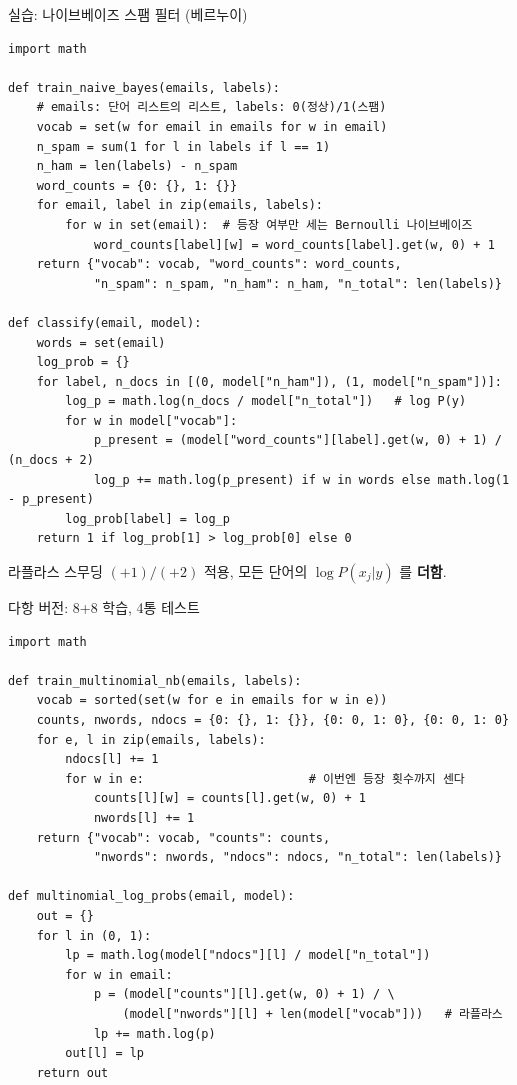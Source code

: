 \documentclass[aspectratio=169,11pt]{beamer}
\begin{document}
\begin{frame}[fragile]{실습: 나이브베이즈 스팸 필터 (베르누이)}
  \begin{lstlisting}
import math

def train_naive_bayes(emails, labels):
    # emails: 단어 리스트의 리스트, labels: 0(정상)/1(스팸)
    vocab = set(w for email in emails for w in email)
    n_spam = sum(1 for l in labels if l == 1)
    n_ham = len(labels) - n_spam
    word_counts = {0: {}, 1: {}}
    for email, label in zip(emails, labels):
        for w in set(email):  # 등장 여부만 세는 Bernoulli 나이브베이즈
            word_counts[label][w] = word_counts[label].get(w, 0) + 1
    return {"vocab": vocab, "word_counts": word_counts,
            "n_spam": n_spam, "n_ham": n_ham, "n_total": len(labels)}

def classify(email, model):
    words = set(email)
    log_prob = {}
    for label, n_docs in [(0, model["n_ham"]), (1, model["n_spam"])]:
        log_p = math.log(n_docs / model["n_total"])   # log P(y)
        for w in model["vocab"]:
            p_present = (model["word_counts"][label].get(w, 0) + 1) / (n_docs + 2)
            log_p += math.log(p_present) if w in words else math.log(1 - p_present)
        log_prob[label] = log_p
    return 1 if log_prob[1] > log_prob[0] else 0
  \end{lstlisting}
  {\footnotesize 라플라스 스무딩 $(+1)/(+2)$ 적용, 모든 단어의
  $\log P(x_j|y)$ 를 \textbf{더함}.}
\end{frame}

\begin{frame}[fragile]{다항 버전: 8+8 학습, 4통 테스트}
  \begin{lstlisting}
import math

def train_multinomial_nb(emails, labels):
    vocab = sorted(set(w for e in emails for w in e))
    counts, nwords, ndocs = {0: {}, 1: {}}, {0: 0, 1: 0}, {0: 0, 1: 0}
    for e, l in zip(emails, labels):
        ndocs[l] += 1
        for w in e:                       # 이번엔 등장 횟수까지 센다
            counts[l][w] = counts[l].get(w, 0) + 1
            nwords[l] += 1
    return {"vocab": vocab, "counts": counts,
            "nwords": nwords, "ndocs": ndocs, "n_total": len(labels)}

def multinomial_log_probs(email, model):
    out = {}
    for l in (0, 1):
        lp = math.log(model["ndocs"][l] / model["n_total"])
        for w in email:
            p = (model["counts"][l].get(w, 0) + 1) / \
                (model["nwords"][l] + len(model["vocab"]))   # 라플라스
            lp += math.log(p)
        out[l] = lp
    return out
  \end{lstlisting}
\end{frame}
\end{document}
